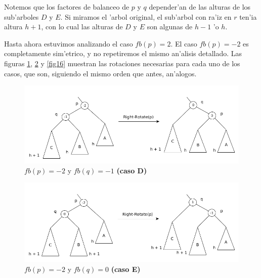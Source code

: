 Notemos que los factores de balanceo de $p$ y $q$ depender'an de las alturas de los sub'arboles $D$ y $E$. Si miramos el 'arbol original, el sub'arbol con ra'iz en $r$ ten'ia altura $h + 1$, con lo cual las alturas de $D$ y $E$ son algunas de $h - 1$ 'o $h$.

Hasta ahora estuvimos analizando el caso $fb(p) = 2$. El caso $fb(p) = -2$ es completamente sim'etrico, y no repetiremos el mismo an'alisis detallado. Las figuras \ref{fig14}, \ref{fig15} y \ref{fig16} muestran las rotaciones necesarias para cada uno de los casos, que son, siguiendo el mismo orden que antes, an'alogos.

\begin{figure}[H]
	\begin{center}
		\includegraphics[scale=0.55]{imagenes/fig14.jpg}
	\end{center}
	\caption{$fb(p) = -2$ y $fb(q) = -1$ \textbf{(caso D)}}
	\label{fig14}
\end{figure}

\begin{figure}[H]
	\begin{center}
		\includegraphics[scale=0.55]{imagenes/fig15.jpg}
	\end{center}
	\caption{$fb(p) = -2$ y $fb(q) = 0$ \textbf{(caso E)}}
	\label{fig15}
\end{figure}

